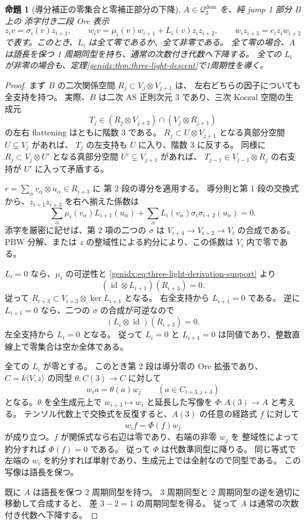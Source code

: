 \documentclass[11pt,a4paper]{ltjsarticle}
\newtheorem{proposition}[theorem]{命題}
\theoremstyle{definition}
\begin{document}
\begin{proposition}[導分補正の零集合と零補正部分の下降]
\label{genidx:prop:three-light-derivation-support}
$A\in\mathcal Q_3^{\mathrm{dom}}$ を、純 jump 1 部分 $B$ 上の
添字付き二段 Ore 表示
\[
z_i v=\sigma_i(v)z_{i+1},\qquad
w_i v=\mu_i(v)w_{i+1}+L_i(v)z_i z_{i+2},\qquad
w_i z_{i+3}=c_i z_iw_{i+2}
\]
で表す。このとき、$L_i$ は全て零であるか、全て非零である。
全て零の場合、$A$ は語長を保つ 1 周期同型を持ち、通常の次数付き代数へ下降する。
全ての $L_i$ が非零の場合も、定理\ref{genidx:thm:three-light-descent}で1周期性を導く。
\end{proposition}
\begin{proof}
まず $B$ の二次関係空間 $R_j\subset V_j\otimes V_{j+1}$ は、
左右どちらの因子についても全支持を持つ。
実際、$B$ は二次 AS 正則次元 3 であり、三次 Koszul 空間の生成元
\[
T_j\in(R_j\otimes V_{j+2})\cap(V_j\otimes R_{j+1})
\]
の左右 flattening はともに階数 3 である。
$R_j\subset U\otimes V_{j+1}$ となる真部分空間 $U\subsetneq V_j$ があれば、
$T_j$ の左支持も $U$ に入り、階数 3 に反する。
同様に $R_j\subset V_j\otimes U'$ となる真部分空間
$U'\subsetneq V_{j+1}$ があれば、
$T_{j-1}\in V_{j-1}\otimes R_j$ の右支持が $U'$ に入って矛盾する。

$r=\sum_\alpha v_\alpha\otimes u_\alpha\in R_{i+3}$ に
第 2 段の導分を適用する。
導分則と第 1 段の交換式から、$z_{i+1}z_{i+3}$ を右へ揃えた係数は
\begin{equation}\label{genidx:eq:three-light-derivation-support}
\sum_\alpha \mu_i(v_\alpha)L_{i+1}(u_\alpha)
+\sum_\alpha L_i(v_\alpha)
 \sigma_i\sigma_{i+2}(u_\alpha)=0.
\end{equation}
添字を厳密に記せば、第 2 項の二つの $\sigma$ は
$V_{i+4}\to V_{i+2}\to V_i$ の合成である。
PBW 分解、または $z$ の整域性による約分により、この係数は $V_i$ 内で零である。

$L_i=0$ なら、$\mu_i$ の可逆性と
\eqref{genidx:eq:three-light-derivation-support} より
\[
(\operatorname{id}\otimes L_{i+1})(R_{i+3})=0.
\]
従って $R_{i+3}\subset V_{i+3}\otimes\ker L_{i+1}$ となる。
右全支持から $L_{i+1}=0$ である。
逆に $L_{i+1}=0$ なら、二つの $\sigma$ の合成が可逆なので
\[
(L_i\otimes\operatorname{id})(R_{i+3})=0.
\]
左全支持から $L_i=0$ となる。
従って $L_i=0$ と $L_{i+1}=0$ は同値であり、整数直線上で零集合は空か全体である。

全ての $L_i$ が零とする。
このとき第 2 段は導分零の Ore 拡張であり、
$C=k\langle V,z\rangle$ の同型 $\theta:C(3)\to C$ に対して
\[
w_i a=\theta(a)w_j\qquad(a\in C_{i+3,j+3})
\]
となる。$\theta$ を全生成元上で
$w_{i+3}\mapsto w_i$ と延長した写像を $\Phi:A(3)\to A$ と考える。
テンソル代数上で交換式を反復すると、$A(3)$ の任意の経路式 $f$ に対して
\[
w_i\overline f=\overline{\Phi(f)}w_j
\]
が成り立つ。$f$ が関係式なら右辺は零であり、右端の非零 $w_j$ を
整域性によって約分すれば $\Phi(f)=0$ である。
従って $\Phi$ は代数準同型に降りる。
同じ等式で左端の $w_i$ を約分すれば単射であり、生成元上では全射なので同型である。
この写像は語長を保つ。

既に $A$ は語長を保つ 2 周期同型を持つ。
3 周期同型と 2 周期同型の逆を適切に移動して合成すると、
差 $3-2=1$ の周期同型を得る。
従って $A$ は通常の次数付き代数へ下降する。
\end{proof}
\end{document}
